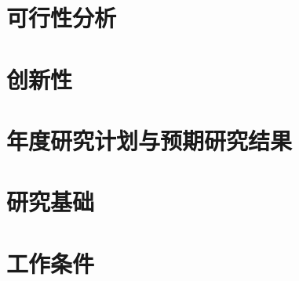 \documentclass[UTF8,a4paper,twoside,12pt]{article}
\begin{document}
\section{可行性分析}
\section{创新性}
\section{年度研究计划与预期研究结果}
\section{研究基础}
\section{工作条件}
\end{document}
